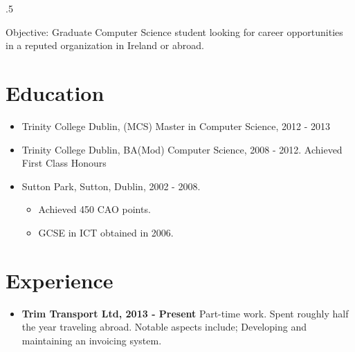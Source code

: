 \documentclass{res}
\begin{document}
 

\thispagestyle{empty} %
\pagestyle{empty}
\address{14 Strand Road\\
Sutton\\
Dublin 13\\
00 353 86 3807768\\
divines@tcd.ie\\
github.com/Divo}






\begin{resume}
\vspace{0.1in}
\moveleft.5\sectionwidth\centerline{Objective: Graduate Computer Science student looking for career opportunities in a reputed organization in Ireland or abroad.}  


\section{Education}
\vspace{0.1in} 

  \begin{itemize}
    \item Trinity College Dublin, (MCS) Master in Computer Science, 2012 - 2013
 
    \item Trinity College Dublin, BA(Mod) Computer Science, 2008 - 2012. Achieved First Class Honours
 
    \item Sutton Park, Sutton, Dublin, 2002 - 2008.
      \begin{itemize}
        \item Achieved 450 CAO points.
        \item GCSE in ICT obtained in 2006.
      \end{itemize}
  \end{itemize}
    

\section{Experience} 
\vspace{0.1in}
  \begin{itemize}
    \item{\bf{Trim Transport Ltd, 2013 - Present}} Part-time work. Spent roughly half the year traveling abroad. Notable aspects include; Developing and maintaining an invoicing system.\\


\end{itemize}
\end{resume}
\end{document}
